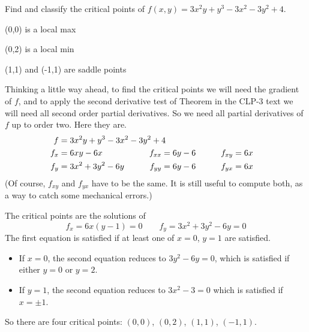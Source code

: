 \begin{question}[M200 2015D] %
Find and classify the critical points of 
$f(x,y) = 3x^2 y + y^3 - 3x^2 - 3y^2 + 4$.
\end{question}

%

\begin{answer}
(0,0) is a local max

(0,2) is a local min

(1,1) and (-1,1) are saddle points
\end{answer}

\begin{solution}
Thinking a little way ahead, to find the critical points we will need the
gradient of $f$, and to apply the second derivative test of 
Theorem  in the CLP-3 text 
we will need all 
second order partial derivatives. So we need all partial derivatives of
$f$ up to order two.
Here they are.
\begin{alignat*}{3}
f&=3x^2 y + y^3 - 3x^2 - 3y^2 + 4 \hidewidth\\
f_x&=6xy-6x   & f_{xx}&=6y-6 \qquad & f_{xy}&= 6x\\
f_y&=3x^2+3y^2-6y \qquad & f_{yy}&=6y-6\qquad & f_{yx}&= 6x
\end{alignat*}
(Of course, $f_{xy}$ and $f_{yx}$ have to be the same. It is still
useful to compute both, as a way to catch some mechanical errors.)

The critical points are the solutions of
\begin{equation*}
f_x=6x(y-1)=0   \qquad
f_y=3x^2+3y^2-6y = 0
\end{equation*}
The first equation is satisfied if at least one of $x=0$, $y=1$
are satisfied.
\begin{itemize}
\item 
If $x=0$, the second equation reduces to $3y^2-6y=0$, which is
satisfied if either $y=0$ or $y=2$.
\item 
If $y=1$, the second equation reduces to $3x^2 -3=0$
which is satisfied if $x=\pm 1$.
\end{itemize}
So there are four critical points: $(0,0)$, $(0,2)$, $(1,1)$,
$(-1,1)$.



\end{solution}
